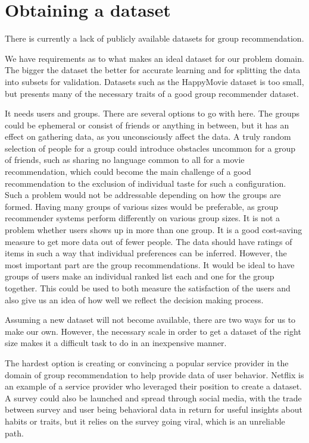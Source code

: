 \section{Obtaining a dataset}
There is currently a lack of publicly available datasets for group recommendation.

We have requirements as to what makes an ideal dataset for our problem domain. The bigger the dataset the better for accurate learning and for splitting the data into subsets for validation. Datasets such as the HappyMovie dataset \cite{HappyMovie} is too small, but presents many of the necessary traits of a good group recommender dataset.

It needs users and groups. There are several options to go with here. The groups could be ephemeral or consist of friends or anything in between, but it has an effect on gathering data, as you unconsciously affect the data. A truly random selection of people for a group could introduce obstacles uncommon for a group of friends, such as sharing no language common to all for a movie recommendation, which could become the main challenge of a good recommendation to the exclusion of individual taste for such a configuration. Such a problem would not be addressable depending on how the groups are formed. Having many groups of various sizes would be preferable, as group recommender systems perform differently on various group sizes. It is not a problem whether users shows up in more than one group. It is a good cost-saving measure to get more data out of fewer people. The data should have ratings of items in such a way that individual preferences can be inferred. However, the most important part are the group recommendations. It would be ideal to have groups of users make an individual ranked list each  and one for the group together. This could be used to both measure the satisfaction of the users and also give us an idea of how well we reflect the decision making process.

Assuming a new dataset will not become available, there are two ways for us to make our own. However, the necessary scale in order to get a dataset of the right size makes it a difficult task to do in an inexpensive manner.

The hardest option is creating or convincing a popular service provider in the domain of group recommendation to help provide data of user behavior. Netflix is an example of a service provider who leveraged their position to create a dataset. A survey could also be launched and spread through social media, with the trade between survey and user being behavioral data in return for useful insights about habits or traits, but it relies on the survey going viral, which is an unreliable path.

